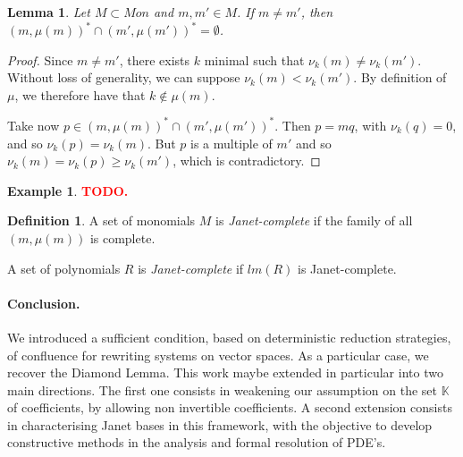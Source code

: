 \documentclass[10pt]{easychair}
\newtheorem{lemma}[theorem]{Lemma}
\theoremstyle{definition}
\newtheorem{definition}[theorem]{Definition}
\newtheorem{example}[theorem]{Example}
\newcommand\todo[1]{{\bf\textcolor{red}{#1.}}}
\newcommand\K{\mathbb{K}}
\begin{document}
\begin{lemma}\label{lem:multiplicative_cones_disjoint}
Let $M \subset Mon$ and $m,m' \in M$. If $m \neq m'$, then $(m,\mu(m))^* \cap (m',\mu(m'))^* = \emptyset$.
\end{lemma}
\begin{proof}
   Since $m \neq m'$, there exists $k$ minimal such that $\nu_k(m) \neq \nu_k(m')$. Without loss of generality, we can suppose $\nu_k(m) < \nu_k(m')$. By definition of $\mu$, we therefore have that $k \notin \mu(m)$.

   Take now $p \in (m,\mu(m))^* \cap (m',\mu(m'))^*$. Then $p = mq$, with $\nu_k(q) = 0$, and so $\nu_k(p) = \nu_k(m)$. But $p$ is a multiple of $m'$ and so $\nu_k(m) = \nu_k(p) \geq \nu_k(m')$, which is contradictory.
 \end{proof}

 \begin{example}
\todo{TODO}
 \end{example}

 \begin{definition}
   A set of monomials $M$ is \emph{Janet-complete} if the family of all $(m,\mu(m))$ is complete.

   A set of polynomials $R$ is \emph{Janet-complete} if $lm(R)$ is Janet-complete.
\end{definition}




\paragraph{Conclusion.} We introduced a sufficient condition, based on deterministic reduction strategies, of confluence for rewriting systems on vector spaces. As a particular case, we recover the Diamond Lemma. This work maybe extended in particular into two main directions. The first one consists in weakening our assumption on the set $\K$ of coefficients, by allowing non invertible coefficients. A second extension consists in characterising Janet bases in this framework, with the objective to develop constructive methods in the analysis and formal resolution of PDE's.


\end{document}
